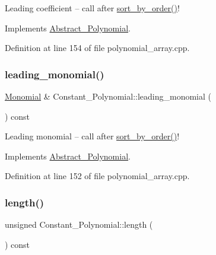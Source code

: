 Leading coefficient -- call after \hyperlink{class_constant___polynomial_a0cee48bfc1ba32d1ddfd5e78acbf7ba2}{sort\+\_\+by\+\_\+order()}! 

Implements \hyperlink{class_abstract___polynomial_a511ce8e997fe3fd1141293d256e25fad}{Abstract\+\_\+\+Polynomial}.



Definition at line 154 of file polynomial\+\_\+array.\+cpp.

\mbox{\label{class_constant___polynomial_a81c14a0b368edec44cef38ba3cbfb1b3}} 
\subsubsection{\texorpdfstring{leading\+\_\+monomial()}{leading\_monomial()}}
{\footnotesize\ttfamily \hyperlink{class_monomial}{Monomial} \& Constant\+\_\+\+Polynomial\+::leading\+\_\+monomial (\begin{DoxyParamCaption}{ }\end{DoxyParamCaption}) const\hspace{0.3cm}{\ttfamily [virtual]}}

Leading monomial -- call after \hyperlink{class_constant___polynomial_a0cee48bfc1ba32d1ddfd5e78acbf7ba2}{sort\+\_\+by\+\_\+order()}! 

Implements \hyperlink{class_abstract___polynomial_a9186ed0f55c5cc4ecb1b9bc11ba9f679}{Abstract\+\_\+\+Polynomial}.



Definition at line 152 of file polynomial\+\_\+array.\+cpp.

\mbox{\label{class_constant___polynomial_ae1453ef5c898778065be3c3ea2965a10}} 
\subsubsection{\texorpdfstring{length()}{length()}}
{\footnotesize\ttfamily unsigned Constant\+\_\+\+Polynomial\+::length (\begin{DoxyParamCaption}{ }\end{DoxyParamCaption}) const\hspace{0.3cm}{\ttfamily [virtual]}}

